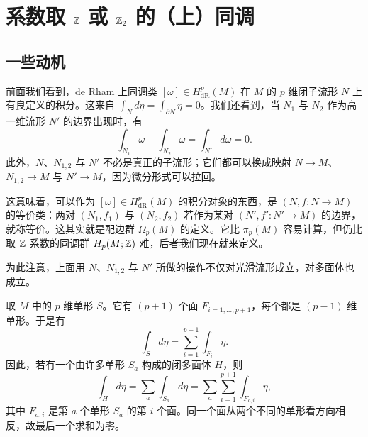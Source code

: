 
\chapter[系数取 Z 或 Z2 的（上）同调]{系数取 $\mathbb{Z}$ 或 $\mathbb{Z}_2$ 的（上）同调}

\section{一些动机}

前面我们看到，de Rham 上同调类 $[\omega]\in H^p_{\mathrm{dR}}(M)$ 在 $M$ 的 $p$ 维闭子流形 $N$ 上有良定义的积分。这来自 $\int_Nd\eta=\int_{\partial N}\eta=0$。我们还看到，当 $N_1$ 与 $N_2$ 作为高一维流形 $N'$ 的边界出现时，有
\begin{equation}
  \int_{N_1}\omega-\int_{N_2}\omega=\int_{N'}d\omega=0.
  \tag{6.1}
\end{equation}
此外，$N$、$N_{1,2}$ 与 $N'$ 不必是真正的子流形；它们都可以换成映射 $N\to M$、$N_{1,2}\to M$ 与 $N'\to M$，因为微分形式可以拉回。

这意味着，可以作为 $[\omega]\in H^p_{\mathrm{dR}}(M)$ 的积分对象的东西，是 $(N,f:N\to M)$ 的等价类：两对 $(N_1,f_1)$ 与 $(N_2,f_2)$ 若作为某对 $(N',f':N'\to M)$ 的边界，就称等价。这其实就是配边群 $\Omega_p(M)$ 的定义。它比 $\pi_p(M)$ 容易计算，但仍比取 $\mathbb{Z}$ 系数的同调群 $H_p(M;\mathbb{Z})$ 难，后者我们现在就来定义。

为此注意，上面用 $N$、$N_{1,2}$ 与 $N'$ 所做的操作不仅对光滑流形成立，对多面体也成立。

取 $M$ 中的 $p$ 维单形 $S$。它有 $(p+1)$ 个面 $F_{i=1,\dots,p+1}$，每个都是 $(p-1)$ 维单形。于是有
\begin{equation}
  \int_Sd\eta=\sum_{i=1}^{p+1}\int_{F_i}\eta.
  \tag{6.2}
\end{equation}
因此，若有一个由许多单形 $S_a$ 构成的闭多面体 $H$，则
\begin{equation}
  \int_Hd\eta=\sum_a\int_{S_a}d\eta=\sum_a\sum_{i=1}^{p+1}\int_{F_{a,i}}\eta,
  \tag{6.3}
\end{equation}
其中 $F_{a,i}$ 是第 $a$ 个单形 $S_a$ 的第 $i$ 个面。同一个面从两个不同的单形看方向相反，故最后一个求和为零。

